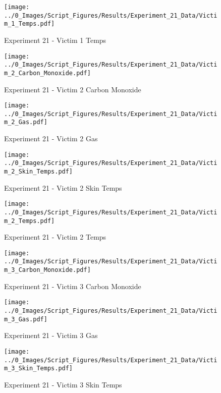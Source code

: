 	\begin{figure}[H]
		\centering
		\texttt{[image: ../0\_Images/Script\_Figures/Results/Experiment\_21\_Data/Victim\_1\_Temps.pdf]}
		\caption[]{Experiment 21 - Victim 1 Temps}
	\end{figure}
 
	\clearpage

	\begin{figure}[H]
		\centering
		\texttt{[image: ../0\_Images/Script\_Figures/Results/Experiment\_21\_Data/Victim\_2\_Carbon\_Monoxide.pdf]}
		\caption[]{Experiment 21 - Victim 2 Carbon Monoxide}
	\end{figure}
 

	\begin{figure}[H]
		\centering
		\texttt{[image: ../0\_Images/Script\_Figures/Results/Experiment\_21\_Data/Victim\_2\_Gas.pdf]}
		\caption[]{Experiment 21 - Victim 2 Gas}
	\end{figure}
 
	\clearpage

	\begin{figure}[H]
		\centering
		\texttt{[image: ../0\_Images/Script\_Figures/Results/Experiment\_21\_Data/Victim\_2\_Skin\_Temps.pdf]}
		\caption[]{Experiment 21 - Victim 2 Skin Temps}
	\end{figure}
 

	\begin{figure}[H]
		\centering
		\texttt{[image: ../0\_Images/Script\_Figures/Results/Experiment\_21\_Data/Victim\_2\_Temps.pdf]}
		\caption[]{Experiment 21 - Victim 2 Temps}
	\end{figure}
 
	\clearpage

	\begin{figure}[H]
		\centering
		\texttt{[image: ../0\_Images/Script\_Figures/Results/Experiment\_21\_Data/Victim\_3\_Carbon\_Monoxide.pdf]}
		\caption[]{Experiment 21 - Victim 3 Carbon Monoxide}
	\end{figure}
 

	\begin{figure}[H]
		\centering
		\texttt{[image: ../0\_Images/Script\_Figures/Results/Experiment\_21\_Data/Victim\_3\_Gas.pdf]}
		\caption[]{Experiment 21 - Victim 3 Gas}
	\end{figure}
 
	\clearpage

	\begin{figure}[H]
		\centering
		\texttt{[image: ../0\_Images/Script\_Figures/Results/Experiment\_21\_Data/Victim\_3\_Skin\_Temps.pdf]}
		\caption[]{Experiment 21 - Victim 3 Skin Temps}
	\end{figure}
 

